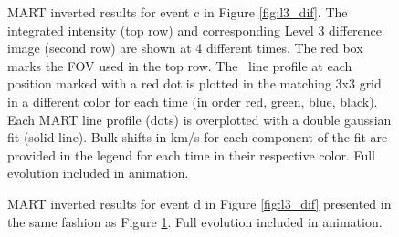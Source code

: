    
    	\begin{figure}
    		\caption{MART inverted results for event c in Figure \ref{fig:l3_dif}. 
    			The integrated intensity (top row) and corresponding Level 3 difference image (second row) are shown at 4 different times. The red box marks the FOV used in the top row.  
    			The \ov \ line profile at each position marked with a red dot is plotted in the matching 3x3 grid in a different color for each time (in order red, green, blue, black). 
    			Each MART line profile (dots) is overplotted with a double gaussian fit (solid line).  
    			Bulk shifts in km/s for each component of the fit are provided in the legend for each time in their respective color. 
    			Full evolution included in animation.    		
    		}
    		\label{fig:perfect_x_inverted}
    	\end{figure}
    

        
        \begin{figure}
    	\caption{MART inverted results for event d in Figure \ref{fig:l3_dif} presented in the same fashion as Figure \ref{fig:perfect_x_inverted}. 
		Full evolution included in animation.
    	}
    	\label{fig:other_x_inverted}
    	\end{figure}
    	
